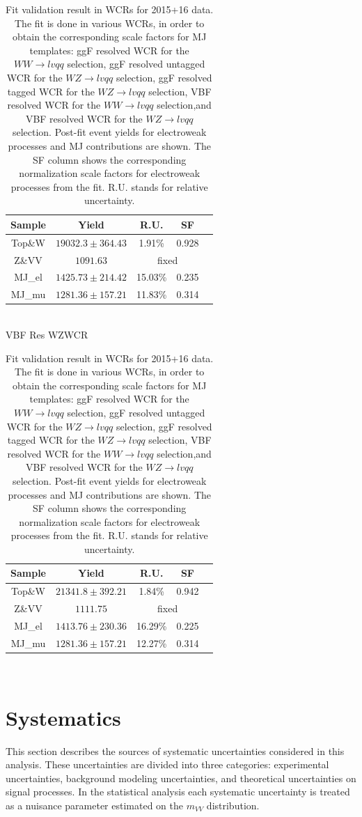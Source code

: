 \begin{table}[ht]
\begin{tabular}{|c|c|c|c|c|}
      \hline
     Sample    & Yield   & R.U.    & SF    \\ \hline
     Top\&W    & $19032.3\pm 364.43$  & 1.91\%  & 0.928  \\ \hline
     Z\&VV     & $1091.63$ & \multicolumn{2}{c|}{fixed} \\ \hline
     MJ\_el    & $1425.73\pm 214.42$  & 15.03\%  &0.235   \\ \hline
     MJ\_mu    & $1281.36\pm 157.21$  & 11.83\%  &0.314   \\ \hline
     \end{tabular}\hfill%
     \\
     \large{VBF Res WZWCR\\ }
     \begin{tabular}{|c|c|c|c|c|}
      \hline
     Sample    & Yield   & R.U.    & SF    \\ \hline
     Top\&W    & $21341.8\pm 392.21$  & 1.84\%  & 0.942  \\ \hline
     Z\&VV     & $1111.75$ & \multicolumn{2}{c|}{fixed} \\ \hline
     MJ\_el    & $1413.76\pm 230.36$  & 16.29\%  &0.225   \\ \hline
     MJ\_mu    & $1281.36\pm 157.21$  & 12.27\%  &0.314   \\ \hline
     \end{tabular}\hfill%
     \\
\caption{\label{tab:template_validation_CR} Fit validation result in WCRs for 2015+16 data. 
The fit is done in various WCRs, in order to obtain the corresponding scale factors for MJ templates: ggF resolved WCR for the $WW\to lvqq$ selection, ggF resolved untagged WCR for the $WZ\to lvqq$ selection,  ggF resolved tagged WCR for the $WZ\to lvqq$ selection,  VBF resolved WCR for the $WW\to lvqq$ selection,and VBF resolved WCR for the $WZ\to lvqq$ selection. Post-fit event yields for electroweak processes and MJ contributions are shown. The SF column shows the corresponding normalization scale factors for electroweak processes from the fit.
R.U. stands for relative uncertainty.
}
\end{table}



\section{Systematics}

This section describes the sources of systematic uncertainties considered in this analysis. These uncertainties are divided into three categories: experimental uncertainties, background modeling uncertainties, and theoretical uncertainties on signal processes. In the statistical analysis each systematic uncertainty is treated as a nuisance parameter estimated on the $m_{VV}$ distribution.

